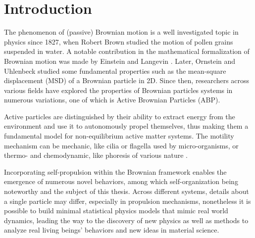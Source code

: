 \documentclass[../../master_thesis_np.tex]{subfiles}
\begin{document}
 
\chapter{Introduction}
	The phenomenon of (passive) Brownian motion is a well investigated topic in physics since 1827, when Robert Brown studied the motion of pollen grains suspended in water.
	A notable contribution in the mathematical formalization of Brownian motion was made by Einstein and Langevin \cite{gardiner_handbook_2004}. 
	Later, Ornstein and Uhlenbeck \cite{uhlenbeck_theory_1930} studied some fundamental properties such as the mean-square displacement (MSD) of a Brownian particle in 2D. 
	Since then, researchers across various fields have explored the properties of Brownian particles systems in numerous variations, one of which is Active Brownian Particles (ABP).
	
	Active particles are distinguished by their ability to extract energy from the environment and use it to autonomously propel themselves, thus making them a fundamental model for non-equilibrium active matter systems.	
	The motility mechanism can be mechanic, like cilia or flagella used by micro-organisms, or thermo- and chemodynamic, like phoresis of various nature \citeauthor{moran_phoretic_2017}.
	
	Incorporating self-propulsion within the Brownian framework enables the emergence of numerous novel behaviors, among which self-organization being noteworthy and the subject of this thesis. 
	Across different systems, details about a single particle may differ, especially in propulsion mechanisms, nonetheless it is possible to build minimal statistical physics models that mimic real world dynamics, leading the way to the discovery of new physics as well as methods to analyze real living beings' behaviors and new ideas in material science. 
	
	
\end{document}
